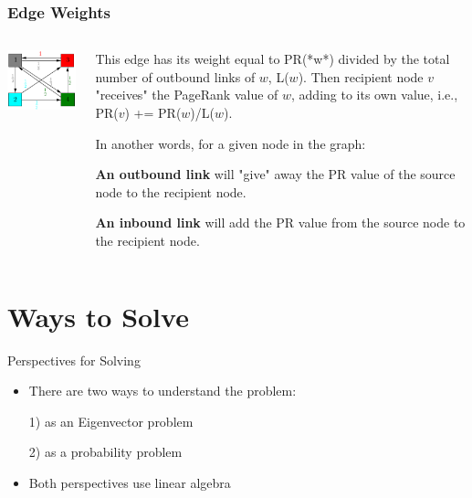\documentclass{beamer}
\begin{document}
\begin{frame}
\frametitle{Edge Weights}
\begin{columns}
    \begin{column}{0.5\textwidth}
        \includegraphics[width=\textwidth]{weighted.png}
    \end{column}
    \begin{column}{0.5\textwidth}
        This edge has its weight equal to PR(*w*) divided by the total number of outbound links of $w$, L($w$). Then recipient node $v$ "receives" the PageRank value of $w$, adding to its own value, i.e., PR($v$) += PR($w$)/L($w$). 
        
        In another words, for a given node in the graph:

        \textbf{An outbound link} will "give" away the PR value of the source node to the recipient node.  

        \textbf{An inbound link} will add the PR value from the source node to the recipient node.
    \end{column}
\end{columns}
\end{frame}

\section{Ways to Solve}
\begin{frame}[t]{Perspectives for Solving}
    \begin{itemize}
        \setlength\itemsep{1em}
        \item There are two ways to understand the problem:
        \item[1)] as an Eigenvector problem
        \item[2)] as a probability problem
        \item Both perspectives use linear algebra 
    \end{itemize}
\end{frame}
\end{document}
